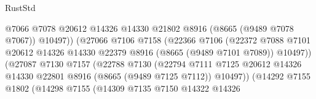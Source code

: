 \begin{lexlean}{RustStd}
\begin{coremodule}
                                            @7066
                                            @7078
                                            @20612
                                            @14326
                                            @14330
                                            @21802
                                            @8916
                                            (@8665 (@9489 @7078 @7067))
                                            @10497))
                                        (@27066
                                          @7106
                                          @7158
                                          (@22366
                                            @7106
                                            (@22372
                                              @7088
                                              @7101
                                              @20612
                                              @14326
                                              @14330
                                              @22379
                                              @8916
                                              (@8665 (@9489 @7101 @7089))
                                              @10497))
                                          (@27087
                                            @7130
                                            @7157
                                            (@22788
                                              @7130
                                              (@22794
                                                @7111
                                                @7125
                                                @20612
                                                @14326
                                                @14330
                                                @22801
                                                @8916
                                                (@8665 (@9489 @7125 @7112))
                                                @10497))
                                            (@14292
                                              @7155
                                              @1802
                                              (@14298
                                                @7155
                                                (@14309
                                                  @7135
                                                  @7150
                                                  @14322
                                                  @14326

\end{coremodule}
\end{lexlean}
